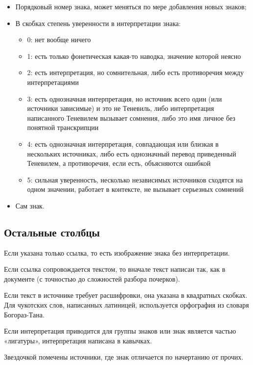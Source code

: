 \documentclass{article}
\begin{document}
\begin{itemize}
\item Порядковый номер знака, может меняться по мере добавления новых знаков; 
\item В скобках степень уверенности в интерпретации знака:
	\begin{itemize}
		\item 0:	нет вообще ничего
		\item 1: 	есть только фонетическая какая-то наводка, значение которой неясно
		\item 2:	есть интерпретация, но сомнительная, либо есть противоречия между интерпретациями
		\item 3:	есть однозначная интерпретация, но источник всего один (или источники зависимые) и это не Теневиль, либо интерпретация написанного Теневилем вызывает сомнения, либо это имя личное без понятной транскрипции
		\item 4:	есть однозначная интерпретация, совпадающая или близкая в нескольких источниках,  либо есть однозначный перевод приведенный Теневилем, а противоречия, если есть, объясняются ошибкой
		\item 5:	сильная уверенность, несколько независимых источников сходятся на одном значении, работает в контексте, не вызывает серьезных сомнений %
	\end{itemize}
\item Сам знак.
\end{itemize}

\subsection{Остальные столбцы}

Если указана только ссылка, то есть изображение знака без интерпретации.

Если ссылка сопровождается текстом, то вначале текст написан так, как в документе (с точностью до сложностей разбора почерков). 

Если текст в источнике требует расшифровки, она указана в квадратных скобках. Для чукотских слов, написанных латиницей, используется орфография из словаря Богораз-Тана\cite{bogoraz1937}.

Если интерпретация приводится для группы знаков или знак является частью «лигатуры», интерпретация написана в кавычках.

Звездочкой помечены источники, где знак отличается по начертанию от прочих.
\end{document}
